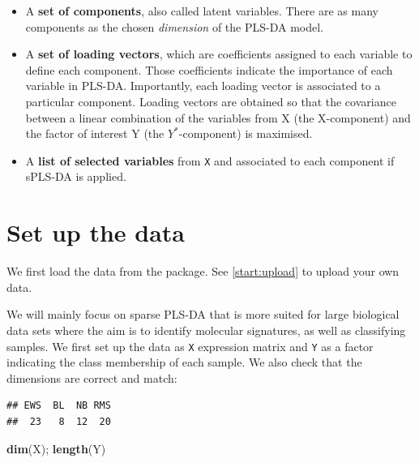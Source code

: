 \documentclass[]{book}
\newenvironment{Shaded}{\begin{snugshade}}{\end{snugshade}}
\newcommand{\KeywordTok}[1]{\textcolor[rgb]{0.13,0.29,0.53}{\textbf{#1}}}
\newcommand{\NormalTok}[1]{#1}
\newcommand{\OperatorTok}[1]{\textcolor[rgb]{0.81,0.36,0.00}{\textbf{#1}}}
\newcommand{\StringTok}[1]{\textcolor[rgb]{0.31,0.60,0.02}{#1}}
\begin{document}
\begin{itemize}
\item
  A \textbf{set of components}, also called latent variables. There are as many components as the chosen
  \emph{dimension} of the PLS-DA model.
\item
  A \textbf{set of loading vectors}, which are coefficients assigned to each variable to define each component. Those coefficients indicate the importance of each variable in PLS-DA. Importantly, each loading vector is associated to a particular component. Loading vectors are obtained so that the covariance between a linear combination of the variables from X (the X-component) and the factor of interest Y (the \(Y^*\)-component) is maximised.
\item
  A \textbf{list of selected variables} from \texttt{X} and associated to each component if sPLS-DA is applied.
\end{itemize}

\hypertarget{set-up-the-data}{%
\section{Set up the data}\label{set-up-the-data}}

We first load the data from the package. See \ref{start:upload} to upload your own data.

We will mainly focus on sparse PLS-DA that is more suited for large biological data sets where the aim is to identify molecular signatures, as well as classifying samples. We first set up the data as \texttt{X} expression matrix and \texttt{Y} as a factor indicating the class membership of each sample. We also check that the dimensions are correct and match:

\begin{Shaded}
\end{Shaded}

\begin{verbatim}
## EWS  BL  NB RMS 
##  23   8  12  20
\end{verbatim}

\begin{Shaded}
\begin{Highlighting}[]
\KeywordTok{dim}\NormalTok{(X); }\KeywordTok{length}\NormalTok{(Y)}
\end{Highlighting}
\end{Shaded}
\end{document}
